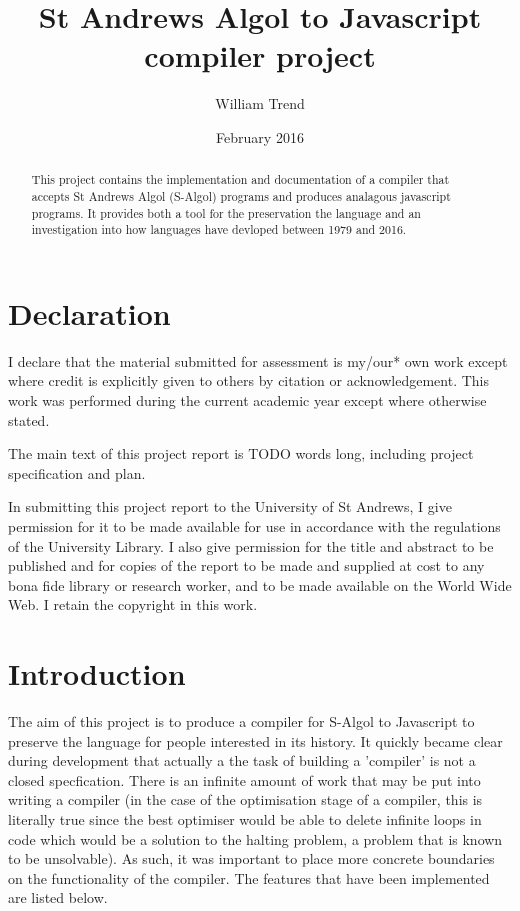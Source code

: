\documentclass{article}
\title{St Andrews Algol to Javascript compiler project}
\author{William Trend}
\date{February 2016}
\begin{document}
\maketitle

\begin{abstract}
This project contains the implementation and documentation of a compiler that accepts St Andrews Algol (S-Algol) programs and produces analagous javascript programs. It provides both a tool for the preservation the language and an investigation into how languages have devloped between 1979 and 2016.

\end{abstract}

\section{Declaration}
I declare that the material submitted for assessment is my/our* own work except where credit is explicitly given to others by citation or acknowledgement. This work was performed during the current academic year except where otherwise stated.

The main text of this project report is TODO words long, including project specification and plan.

In submitting this project report to the University of St Andrews, I give permission for it to be made available for use in accordance with the regulations of the University Library. I also give permission for the title and abstract to be published and for copies of the report to be made and supplied at cost to any bona fide library or research worker, and to be made available on the World Wide Web. I retain the copyright in this work.

\section{Introduction}

The aim of this project is to produce a compiler for S-Algol to Javascript to preserve the language for people interested in its history. It quickly became clear during development that actually a the task of building a 'compiler' is not a closed specfication. There is an infinite amount of work that may be put into writing a compiler (in the case of the optimisation stage of a compiler, this is literally true since the best optimiser would be able to delete infinite loops in code which would be a solution to the halting problem, a problem that is known to be unsolvable). As such, it was important to place more concrete boundaries on the functionality of the compiler. The features that have been implemented are listed below.
\end{document}
